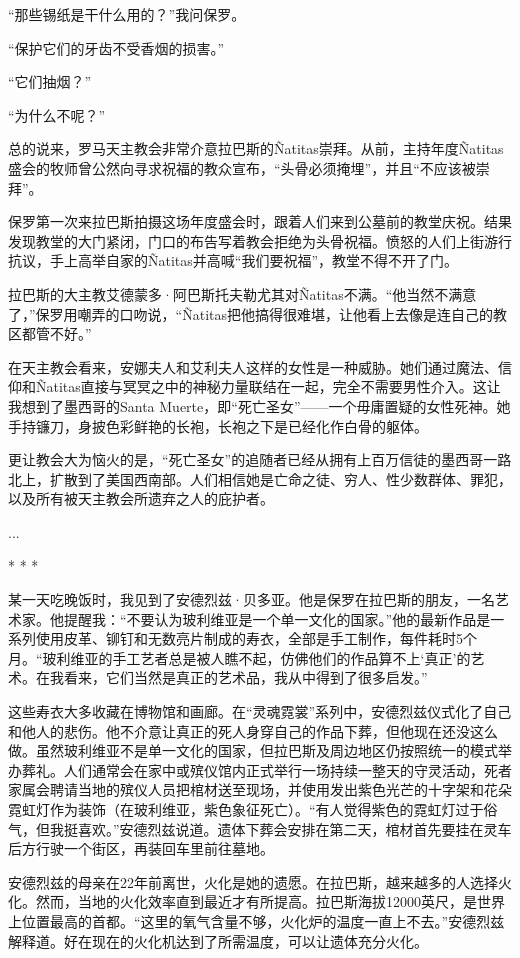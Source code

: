 \documentclass[12pt,oneside]{book}
\begin{document}
\begin{bookref}[frametitle={\cite{好好告别}}]
“那些锡纸是干什么用的？”我问保罗。

“保护它们的牙齿不受香烟的损害。”

“它们抽烟？”

“为什么不呢？”

总的说来，罗马天主教会非常介意拉巴斯的Ñatitas崇拜。从前，主持年度Ñatitas盛会的牧师曾公然向寻求祝福的教众宣布，“头骨必须掩埋”，并且“不应该被崇拜”。

保罗第一次来拉巴斯拍摄这场年度盛会时，跟着人们来到公墓前的教堂庆祝。结果发现教堂的大门紧闭，门口的布告写着教会拒绝为头骨祝福。愤怒的人们上街游行抗议，手上高举自家的Ñatitas并高喊“我们要祝福”，教堂不得不开了门。

拉巴斯的大主教艾德蒙多·阿巴斯托夫勒尤其对Ñatitas不满。“他当然不满意了，”保罗用嘲弄的口吻说，“Ñatitas把他搞得很难堪，让他看上去像是连自己的教区都管不好。”

在天主教会看来，安娜夫人和艾利夫人这样的女性是一种威胁。她们通过魔法、信仰和Ñatitas直接与冥冥之中的神秘力量联结在一起，完全不需要男性介入。这让我想到了墨西哥的Santa Muerte，即“死亡圣女”——一个毋庸置疑的女性死神。她手持镰刀，身披色彩鲜艳的长袍，长袍之下是已经化作白骨的躯体。

更让教会大为恼火的是，“死亡圣女”的追随者已经从拥有上百万信徒的墨西哥一路北上，扩散到了美国西南部。人们相信她是亡命之徒、穷人、性少数群体、罪犯，以及所有被天主教会所遗弃之人的庇护者。

...

\begin{center}
* * *
\end{center}

某一天吃晚饭时，我见到了安德烈兹·贝多亚。他是保罗在拉巴斯的朋友，一名艺术家。他提醒我：“不要认为玻利维亚是一个单一文化的国家。”他的最新作品是一系列使用皮革、铆钉和无数亮片制成的寿衣，全部是手工制作，每件耗时5个月。“玻利维亚的手工艺者总是被人瞧不起，仿佛他们的作品算不上‘真正’的艺术。在我看来，它们当然是真正的艺术品，我从中得到了很多启发。”

这些寿衣大多收藏在博物馆和画廊。在“灵魂霓裳”系列中，安德烈兹仪式化了自己和他人的悲伤。他不介意让真正的死人身穿自己的作品下葬，但他现在还没这么做。虽然玻利维亚不是单一文化的国家，但拉巴斯及周边地区仍按照统一的模式举办葬礼。人们通常会在家中或殡仪馆内正式举行一场持续一整天的守灵活动，死者家属会聘请当地的殡仪人员把棺材送至现场，并使用发出紫色光芒的十字架和花朵霓虹灯作为装饰（在玻利维亚，紫色象征死亡）。“有人觉得紫色的霓虹灯过于俗气，但我挺喜欢。”安德烈兹说道。遗体下葬会安排在第二天，棺材首先要挂在灵车后方行驶一个街区，再装回车里前往墓地。

安德烈兹的母亲在22年前离世，火化是她的遗愿。在拉巴斯，越来越多的人选择火化。然而，当地的火化效率直到最近才有所提高。拉巴斯海拔12000英尺，是世界上位置最高的首都。“这里的氧气含量不够，火化炉的温度一直上不去。”安德烈兹解释道。好在现在的火化机达到了所需温度，可以让遗体充分火化。


\end{bookref}
\end{document}
